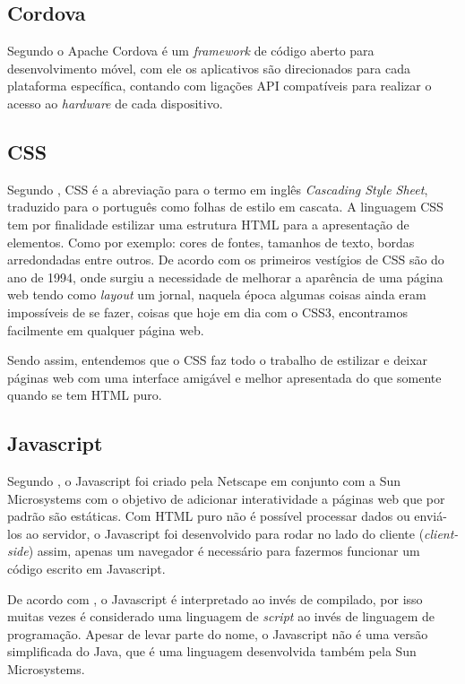 	\subsection{Cordova}
		\par Segundo  o Apache Cordova é um \textit{framework} de código aberto para desenvolvimento móvel, com ele os aplicativos são direcionados para cada plataforma específica, contando com ligações API compatíveis para realizar o acesso ao \textit{hardware} de cada dispositivo.

	\subsection{CSS}
		\par Segundo , CSS é a abreviação para o termo em inglês \textit{Cascading Style Sheet}, traduzido para o
		português como folhas de estilo em cascata. A linguagem CSS tem por finalidade estilizar uma estrutura HTML para a apresentação de elementos. Como por exemplo: cores de fontes, tamanhos de texto, bordas arredondadas entre outros. De acordo com  os primeiros vestígios de CSS são do ano de 1994, onde surgiu a necessidade de melhorar a aparência de uma página web tendo como \textit{layout} um jornal, naquela época algumas coisas ainda eram impossíveis de se fazer, coisas que hoje em dia com o CSS3, encontramos facilmente em qualquer página web.
		\par Sendo assim, entendemos que o CSS faz todo o trabalho de estilizar e deixar páginas web com uma interface amigável e melhor apresentada do que somente quando se tem HTML puro.
		
	\subsection{Javascript}
		\par Segundo , o Javascript foi criado pela Netscape em conjunto com a Sun Microsystems com o objetivo de adicionar interatividade a páginas web que por padrão são estáticas. Com HTML puro não é possível processar dados ou enviá-los ao servidor, o Javascript foi desenvolvido para rodar no lado do cliente (\textit{client-side}) assim, apenas um navegador é necessário para fazermos funcionar um código escrito em Javascript.
		\par De acordo com , o Javascript é interpretado ao invés de compilado, por isso muitas vezes é considerado uma linguagem de \textit{script} ao invés de linguagem de programação. Apesar de levar parte do nome, o Javascript não é uma versão simplificada do Java, que é uma linguagem desenvolvida também pela Sun Microsystems.
		
